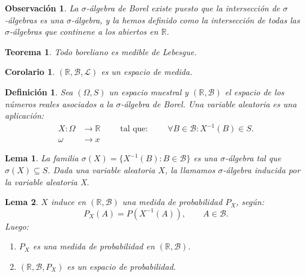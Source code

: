 \documentclass{report}
\newtheorem{thm}{Teorema}[section]
\newtheorem{lem}{Lema}[section]
\newtheorem{cor}{Corolario}[thm]
\newtheorem{dfn}{Definición}[section]
\newtheorem{obs}{Observación}[section]
\begin{document}
\begin{obs}
    La $\sigma$-álgebra de Borel existe puesto que la intersección de $\sigma$-álgebras es una $\sigma$-álgebra, y la hemos definido como la intersección
    de todas las $\sigma$-álgebras que continene a los abiertos en $\mathbb{R}$.
\end{obs}

\begin{thm}
    Todo boreliano es medible de Lebesgue.
\end{thm}

\begin{cor}
    $(\mathbb{R}, \mathcal{B}, \mathscr{L})$ es un espacio de medida.
\end{cor}

\begin{dfn}
    Sea $(\Omega, S)$ un espacio muestral y $(\mathbb{R}, \mathcal{B})$ el espacio de los números reales asociados a la $\sigma$-álgebra de Borel. Una 
    variable aleatoria es una aplicación:
    \begin{equation*}
        \begin{split}
        X: \Omega & \rightarrow \mathbb{R} \qquad \text{ tal que: }  \qquad \forall B \in \mathcal{B}: X^{-1}(B) \in S.\\
            \omega & \rightarrow x
\end{split}
    \end{equation*}

\end{dfn}

\begin{lem}
    La familia $\sigma(X)=\{X^{-1}(B): B\in\mathcal{B}\}$ es una $\sigma$-álgebra tal que $\sigma(X)\subseteq S$. Dada 
    una variable aleatoria $X$, la llamamos $\sigma$-álgebra \emph{inducida} por la variable aleatoria X.
\end{lem}

\begin{lem} $X$ induce en $(\mathbb{R}, \mathcal{B})$ una medida de probabilidad $P_X$, según:
    $$
    P_X(A) = P(X^{-1}(A)), \qquad A\in\mathcal{B}.
    $$
    Luego:
    \begin{enumerate}
        \item $P_X$ es una medida de probabilidad en $(\mathbb{R}, \mathcal{B})$.
        \item $(\mathbb{R}, \mathcal{B}, P_X)$ es un espacio de probabilidad.
    \end{enumerate}
\end{lem}
\end{document}
